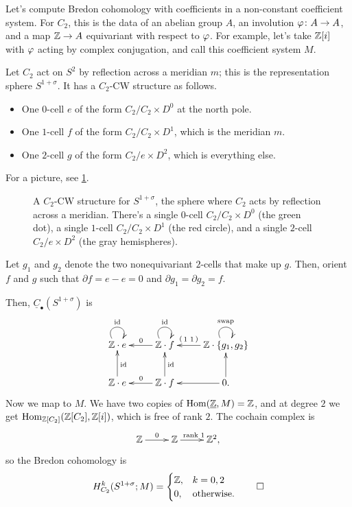 \begin{exm}
Let's compute Bredon cohomology with coefficients in a non-constant coefficient system. For $C_2$, this is the data
of an abelian group $A$, an involution $\varphi\colon A\to A$, and a map $\mathbb Z\to A$ equivariant with respect to $\varphi$.
For example, let's take $\mathbb Z[i]$ with $\varphi$ acting by complex conjugation, and call this coefficient system $M$.

Let $C_2$ act on $S^2$ by reflection across a meridian $m$; this is the representation sphere $S^{1+\sigma}$. It
has a $C_2$-CW structure as follows.
\begin{itemize}
	\item One $0$-cell $e$ of the form $C_2/C_2\times D^0$ at the north pole.
	\item One $1$-cell $f$ of the form $C_2/C_2\times D^1$, which is the meridian $m$.
	\item One $2$-cell $g$ of the form $C_2/e\times D^2$, which is everything else.
\end{itemize}
For a picture, see \cref{S2CWmerid}.
\begin{figure}[h!]
\caption{A $C_2$-CW structure for $S^{1+\sigma}$, the sphere where $C_2$ acts by reflection across a meridian.
There's a single $0$-cell $C_2/C_2\times D^0$ (the green dot), a single $1$-cell $C_2/C_2\times D^1$ (the red
circle), and a single $2$-cell $C_2/e\times D^2$ (the gray hemispheres).}
\label{S2CWmerid}
\end{figure}

Let $g_1$ and $g_2$ denote the two nonequivariant $2$-cells that make up $g$. Then, orient $f$ and $g$ such that
$\partial f = e - e = 0$ and $\partial g_1 = \partial g_2 = f$.

Then, $\underline C_\bullet(S^{1+\sigma})$ is
\[\xymatrix{
	\Z\cdot e\ar@(ul,ur)^\id & \Z\cdot f\ar@(ul,ur)^\id\ar[l]_0 & \Z\cdot\set{g_1,g_2} \ar@(ul,ur)^{\text{swap}}
	\ar[l]_-{\begin{psmallmatrix}1 & 1\end{psmallmatrix}}\\
	\Z\cdot e\ar[u]_\id & \Z\cdot f\ar[l]_0 \ar[u]_\id & 0.\ar[l]\ar[u]
}\]
Now we map to $M$. We have two copies of $\operatorname{Hom}(\underline{\mathbb Z}, M) = \mathbb Z$, and at degree $2$ we get
$\operatorname{Hom}_{\mathbb Z[C_2]}(\mathbb Z[C_2], \mathbb Z[i])$, which is free of rank $2$. The cochain complex is
\[\xymatrix{
	\Z\ar[r]^0 & \Z\ar[r]^{\text{rank }1} & \Z^2,
}\]
so the Bredon cohomology is
\[H_{C_2}^k(S^{1+\sigma}; M) = \begin{cases}
	\mathbb Z, &k = 0,2\\
	0, &\text{otherwise.}
\end{cases}\qedhere\]
\end{exm}

